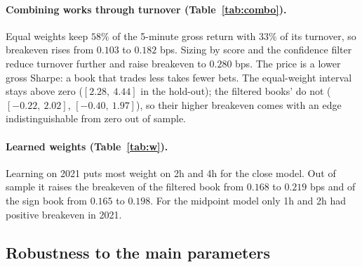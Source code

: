 \documentclass[11pt,a4paper]{article}
\begin{document}
\paragraph{Combining works through turnover (Table~\ref{tab:combo}).} Equal weights keep $58\%$ of the
5-minute gross return with $33\%$ of its turnover, so breakeven rises from $0.103$ to $0.182$
bps. Sizing by score and the confidence filter reduce turnover further and raise breakeven to
$0.280$ bps. The price is a lower gross Sharpe: a book that trades less takes fewer bets. The
equal-weight interval stays above zero ($[2.28,\ 4.44]$ in the hold-out); the filtered books' do not ($[-0.22,\ 2.02]$,
$[-0.40,\ 1.97]$), so their higher breakeven comes with an edge indistinguishable from zero out of sample.

\paragraph{Learned weights (Table~\ref{tab:w}).} Learning on 2021 puts most weight on 2h and 4h for
the close model. Out of sample it raises the breakeven of the filtered book from $0.168$ to $0.219$ bps
and of the sign book from $0.165$ to $0.198$. For the midpoint model only 1h and 2h had positive
breakeven in 2021.

\subsection{Robustness to the main parameters}
\label{sec:sens}
\end{document}
